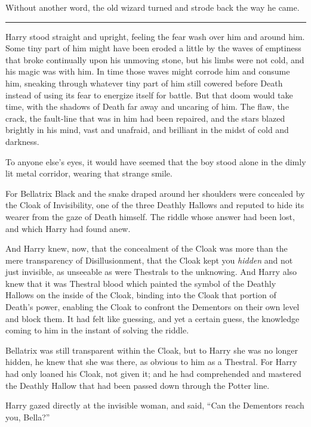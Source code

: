 Without another word, the old wizard turned and strode back the way he
came.

\begin{center}\rule{3in}{0.4pt}\end{center}

Harry stood straight and upright, feeling the fear wash over him and
around him. Some tiny part of him might have been eroded a little by the
waves of emptiness that broke continually upon his unmoving stone, but
his limbs were not cold, and his magic was with him. In time those waves
might corrode him and consume him, sneaking through whatever tiny part
of him still cowered before Death instead of using its fear to energize
itself for battle. But that doom would take time, with the shadows of
Death far away and uncaring of him. The flaw, the crack, the fault-line
that was in him had been repaired, and the stars blazed brightly in his
mind, vast and unafraid, and brilliant in the midst of cold and
darkness.

To anyone else's eyes, it would have seemed that the boy stood alone in
the dimly lit metal corridor, wearing that strange smile.

For Bellatrix Black and the snake draped around her shoulders were
concealed by the Cloak of Invisibility, one of the three Deathly Hallows
and reputed to hide its wearer from the gaze of Death himself. The
riddle whose answer had been lost, and which Harry had found anew.

And Harry knew, now, that the concealment of the Cloak was more than the
mere transparency of Disillusionment, that the Cloak kept you
\emph{hidden} and not just invisible, as unseeable as were Thestrals to
the unknowing. And Harry also knew that it was Thestral blood which
painted the symbol of the Deathly Hallows on the inside of the Cloak,
binding into the Cloak that portion of Death's power, enabling the Cloak
to confront the Dementors on their own level and block them. It had felt
like guessing, and yet a certain guess, the knowledge coming to him in
the instant of solving the riddle.

Bellatrix was still transparent within the Cloak, but to Harry she was
no longer hidden, he knew that she was there, as obvious to him as a
Thestral. For Harry had only loaned his Cloak, not given it; and he had
comprehended and mastered the Deathly Hallow that had been passed down
through the Potter line.

Harry gazed directly at the invisible woman, and said, ``Can the
Dementors reach you, Bella?''

